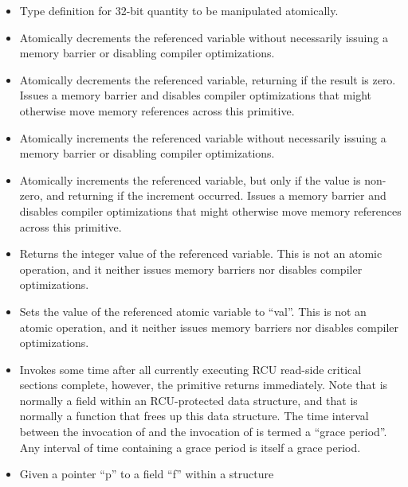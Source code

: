 \begin{itemize}
\item	{}
	Type definition for 32-bit quantity to be manipulated atomically.
\item	{}
	Atomically decrements the referenced variable without necessarily
	issuing a memory barrier or disabling compiler optimizations.
\item	{}
	Atomically decrements the referenced variable, returning
	 if the result is zero.
	Issues a memory barrier and disables compiler optimizations that
	might otherwise move memory references across this primitive.
\item	{}
	Atomically increments the referenced variable without necessarily
	issuing a memory barrier or disabling compiler optimizations.
\item	{}
	Atomically increments the referenced variable, but only if the
	value is non-zero, and returning  if the increment occurred.
	Issues a memory barrier and disables compiler optimizations that
	might otherwise move memory references across this primitive.
\item	{}
	Returns the integer value of the referenced variable.
	This is not an atomic operation, and it neither issues memory
	barriers nor disables compiler optimizations.
\item	{}
	Sets the value of the referenced atomic variable to ``val''.
	This is not an atomic operation, and it neither issues memory
	barriers nor disables compiler optimizations.
\item	{}
	Invokes  some time after all currently executing RCU
	read-side critical sections complete, however, the 
	primitive returns immediately.
	Note that  is normally a field within an RCU-protected
	data structure, and that  is normally a function that
	frees up this data structure.
	The time interval between the invocation of  and
	the invocation of  is termed a ``grace period''.
	Any interval of time containing a grace period is itself a
	grace period.
\item	{}
	Given a pointer ``p'' to a field ``f'' within a structure

\end{itemize}
